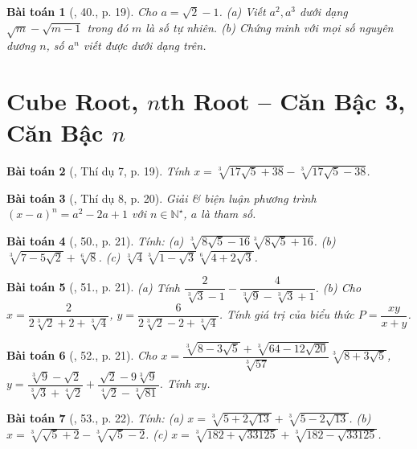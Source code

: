 \documentclass{article}
\newtheorem{baitoan}{Bài toán}
\begin{document}
\begin{baitoan}[\cite{Binh_Toan_9_tap_1}, 40., p. 19]
	Cho $a = \sqrt{2} - 1$. (a) Viết $a^2,a^3$ dưới dạng $\sqrt{m} - \sqrt{m - 1}$ trong đó $m$ là số tự nhiên. (b) Chứng minh với mọi số nguyên dương $n$, số $a^n$ viết được dưới dạng trên.
\end{baitoan}


\section{Cube Root, $n$th Root -- Căn Bậc 3, Căn Bậc $n$}

\begin{baitoan}[\cite{Tuyen_Toan_9}, Thí dụ 7, p. 19]
	Tính $x = \sqrt[3]{17\sqrt{5} + 38} - \sqrt[3]{17\sqrt{5} - 38}$.
\end{baitoan}

\begin{baitoan}[\cite{Tuyen_Toan_9}, Thí dụ 8, p. 20]
	Giải \& biện luận phương trình $(x - a)^n = a^2 - 2a + 1$ với $n\in\mathbb{N}^\star$, $a$ là tham số.
\end{baitoan}

\begin{baitoan}[\cite{Tuyen_Toan_9}, 50., p. 21]
	Tính: (a) $\sqrt[3]{8\sqrt{5} - 16}\sqrt[3]{8\sqrt{5} + 16}$. (b) $\sqrt[3]{7 - 5\sqrt{2}} + \sqrt[6]{8}$. (c) $\sqrt[3]{4}\sqrt[3]{1 - \sqrt{3}}\sqrt[6]{4 + 2\sqrt{3}}$.
\end{baitoan}

\begin{baitoan}[\cite{Tuyen_Toan_9}, 51., p. 21]
	(a) Tính $\dfrac{2}{\sqrt[3]{3} - 1} - \dfrac{4}{\sqrt[3]{9} - \sqrt[3]{3} + 1}$. (b) Cho $x = \dfrac{2}{2\sqrt[3]{2} + 2 + \sqrt[3]{4}}$, $y = \dfrac{6}{2\sqrt[3]{2} - 2 + \sqrt[3]{4}}$. Tính giá trị của biểu thức $P = \dfrac{xy}{x + y}$.
\end{baitoan}

\begin{baitoan}[\cite{Tuyen_Toan_9}, 52., p. 21]
	Cho $x = \dfrac{\sqrt[3]{8 - 3\sqrt{5}} + \sqrt[3]{64 - 12\sqrt{20}}}{\sqrt[3]{57}}\sqrt[3]{8 + 3\sqrt{5}}$, $y = \dfrac{\sqrt[3]{9} - \sqrt{2}}{\sqrt[3]{3} + \sqrt[4]{2}} + \dfrac{\sqrt{2} - 9\sqrt[3]{9}}{\sqrt[4]{2} - \sqrt[3]{81}}$. Tính $xy$.
\end{baitoan}

\begin{baitoan}[\cite{Tuyen_Toan_9}, 53., p. 22]
	Tính: (a) $x = \sqrt[3]{5 + 2\sqrt{13}} + \sqrt[3]{5 - 2\sqrt{13}}$. (b) $x = \sqrt[3]{\sqrt{5} + 2} - \sqrt[3]{\sqrt{5} - 2}$. (c) $x = \sqrt[3]{182 + \sqrt{33125}} + \sqrt[3]{182 - \sqrt{33125}}$.
\end{baitoan}
\end{document}
